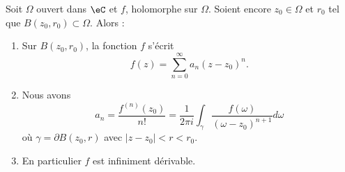 \begin{theorem}     \label{ThomcPOdd}
    Soit \( \Omega\) ouvert dans \( \eC\) et \( f\), holomorphe sur \( \Omega\). Soient encore \( z_0\in \Omega\) et \( r_0\) tel que \( B(z_0,r_0)\subset \Omega\). Alors :
    \begin{enumerate}
        \item
            Sur \( B(z_0,r_0)\), la fonction \( f\) s'écrit
    \begin{equation}
        f(z)=\sum_{n=0}^{\infty}a_n(z-z_0)^n.
    \end{equation}
    \item
        Nous avons
        \begin{equation}
            a_n=\frac{ f^{(n)}(z_0) }{ n! }=\frac{1}{ 2\pi i }\int_{\gamma}\frac{ f(\omega) }{ (\omega-z_0)^{n+1} }d\omega
        \end{equation}
        où \( \gamma=\partial B(z_0,r)\) avec \( | z-z_0 |<r<r_0\).
    \item   \label{ItemMRRTooMChmuZ}
        En particulier \( f\) est infiniment dérivable.
    \end{enumerate}
\end{theorem}

